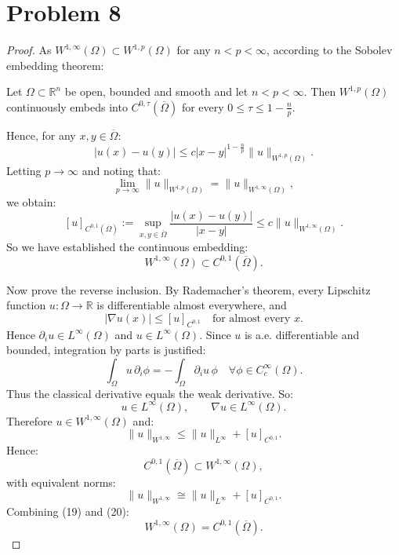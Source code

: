 \section{Problem 8}
\begin{proof}
As $W^{1,\infty}(\Omega)\subset W^{1,p}(\Omega)$ for any $n<p<\infty$, according to the Sobolev embedding theorem:
\begin{theorem}
    Let $\Omega\subset\mathbb{R}^n$ be open, bounded and smooth and let $n<p<\infty$. Then $W^{1,p}(\Omega)$ continuously embeds into $C^{0,\tau}(\overline{\Omega})$ for every $0\le\tau\le 1-\frac{n}{p}$.
\end{theorem}
Hence, for any $x,y\in\overline{\Omega}$:
\[
|u(x)-u(y)|\le c|x-y|^{1-\frac{n}{p}}\|u\|_{W^{1,p}(\Omega)}.
\]
Letting $p\to\infty$ and noting that:
\[
\lim_{p\to\infty}\|u\|_{W^{1,p}(\Omega)}=\|u\|_{W^{1,\infty}(\Omega)},
\]
we obtain:
\[
[u]_{C^{0,1}(\overline{\Omega})} := \sup_{x,y\in \overline{\Omega}}\frac{|u(x)-u(y)|}{|x-y|}\le c\|u\|_{W^{1,\infty}(\Omega)}.
\]
So we have established the continuous embedding:
\[
W^{1,\infty}(\Omega) \subset C^{0,1}(\overline{\Omega}).
\tag{19}
\]

Now prove the reverse inclusion. By Rademacher's theorem, every Lipschitz function $u:\Omega\to\mathbb{R}$ is differentiable almost everywhere, and 
\[
|\nabla u(x)|\le [u]_{C^{0,1}} \quad \text{for almost every } x.
\]
Hence $\partial_i u\in L^\infty(\Omega)$ and $u\in L^\infty(\Omega)$. Since $u$ is a.e. differentiable and bounded, integration by parts is justified:
\[
\int_\Omega u\, \partial_i\phi = -\int_\Omega \partial_i u\,\phi \quad \forall \phi \in C_c^\infty(\Omega).
\]
Thus the classical derivative equals the weak derivative. So:
\[
u\in L^\infty(\Omega), \qquad \nabla u\in L^\infty(\Omega).
\]
Therefore $u\in W^{1,\infty}(\Omega)$ and:
\[
\|u\|_{W^{1,\infty}}\le \|u\|_{L^\infty} + [u]_{C^{0,1}}.
\]
Hence:
\[
C^{0,1}(\overline{\Omega})\subset W^{1,\infty}(\Omega),
\tag{20}
\]
with equivalent norms:
\[
\|u\|_{W^{1,\infty}}\cong \|u\|_{L^\infty}+[u]_{C^{0,1}}.
\]
Combining (19) and (20):
\[
\boxed{
W^{1,\infty}(\Omega) = C^{0,1}(\overline{\Omega}).
}
\]
\end{proof}

